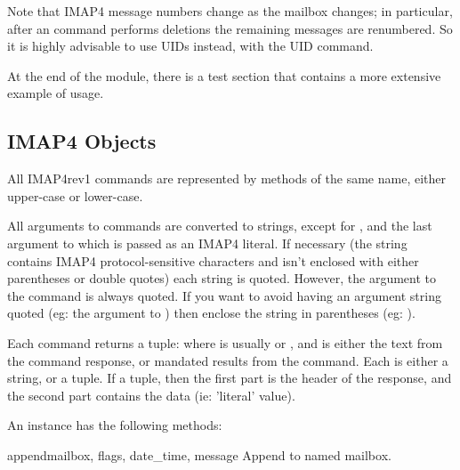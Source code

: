 Note that IMAP4 message numbers change as the mailbox changes; in
particular, after an  command performs deletions the
remaining messages are renumbered. So it is highly advisable to use
UIDs instead, with the UID command.

At the end of the module, there is a test section that contains a more
extensive example of usage.

\begin{seealso}
\end{seealso}


\subsection{IMAP4 Objects \label{imap4-objects}}

All IMAP4rev1 commands are represented by methods of the same name,
either upper-case or lower-case.

All arguments to commands are converted to strings, except for
, and the last argument to  which is
passed as an IMAP4 literal.  If necessary (the string contains IMAP4
protocol-sensitive characters and isn't enclosed with either
parentheses or double quotes) each string is quoted. However, the
 argument to the  command is always quoted.
If you want to avoid having an argument string quoted
(eg: the  argument to ) then enclose the string in
parentheses (eg: ).

Each command returns a tuple:  where  is usually  or ,
and  is either the text from the command response, or
mandated results from the command. Each 
is either a string, or a tuple. If a tuple, then the first part
is the header of the response, and the second part contains
the data (ie: 'literal' value).

An  instance has the following methods:


\begin{methoddesc}{append}{mailbox, flags, date_time, message}
  Append  to named mailbox. 
\end{methoddesc}

